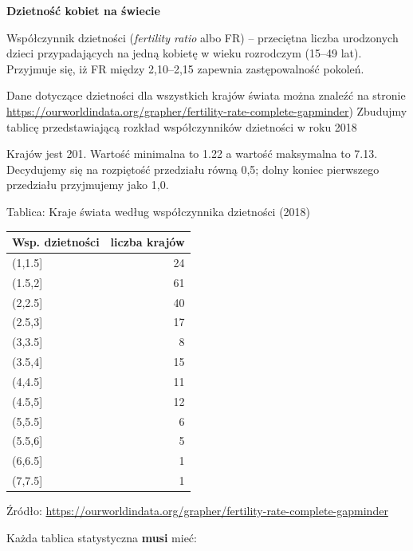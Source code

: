 \documentclass[
  openany]{book}
\begin{document}
\begin{example}
\textbf{Dzietność kobiet na świecie}

Współczynnik dzietności (\emph{fertility ratio} albo FR) -- przeciętna liczba urodzonych dzieci przypadających
na jedną kobietę w wieku rozrodczym (15--49 lat).
Przyjmuje się, iż FR między 2,10--2,15 zapewnia zastępowalność pokoleń.

Dane dotyczące dzietności dla wszystkich krajów świata można
znaleźć na stronie \url{https://ourworldindata.org/grapher/fertility-rate-complete-gapminder})
Zbudujmy tablicę przedstawiającą rozkład współczynników dzietności w roku 2018

Krajów jest 201. Wartość minimalna to 1.22 a wartość
maksymalna to 7.13. Decydujemy się na rozpiętość przedziału równą 0,5;
dolny koniec pierwszego przedziału przyjmujemy jako 1,0.

Tablica: Kraje świata według współczynnika dzietności (2018)

\begin{tabular}{l|r}
\hline
Wsp. dzietności & liczba krajów\\
\hline
(1,1.5] & 24\\
\hline
(1.5,2] & 61\\
\hline
(2,2.5] & 40\\
\hline
(2.5,3] & 17\\
\hline
(3,3.5] & 8\\
\hline
(3.5,4] & 15\\
\hline
(4,4.5] & 11\\
\hline
(4.5,5] & 12\\
\hline
(5,5.5] & 6\\
\hline
(5.5,6] & 5\\
\hline
(6,6.5] & 1\\
\hline
(7,7.5] & 1\\
\hline
\end{tabular}

Źródło: \url{https://ourworldindata.org/grapher/fertility-rate-complete-gapminder}
\end{example}

Każda tablica statystyczna \textbf{musi} mieć:
\end{document}
